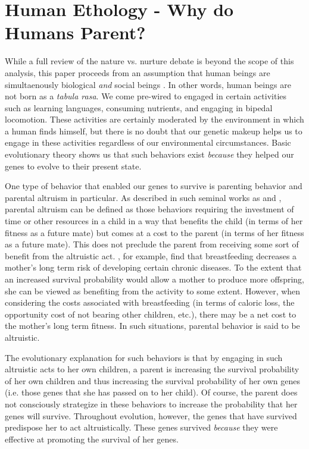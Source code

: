 \documentclass[1p, review]{elsarticle}\usepackage[]{graphicx}\usepackage[]{color}
\begin{document}
\section{Human Ethology - Why do Humans Parent?}

While a full review of the nature vs. nurture debate is beyond the scope of this analysis, this paper proceeds from an assumption that human beings are simultaenously biological \emph{and} social beings \citep[see for example][]{Plomin1994, Ridley2003}. In other words, human beings are not born as a \emph{tabula rasa}. We come pre-wired to engaged in certain activities such as learning languages, consuming nutrients, and engaging in bipedal locomotion. These activities are certainly moderated by the environment in which a human finds himself, but there is no doubt that our genetic makeup helps us to engage in these activities regardless of our environmental circumstances. Basic evolutionary theory shows us that such behaviors exist \emph{because} they helped our genes to evolve to their present state. 

One type of behavior that enabled our genes to survive is parenting behavior and parental altruism in particular. As described in such seminal works as \citet{Hamilton1964} and \citet{Trivers1974}, parental altruism can be defined as those behaviors requiring the investment of time or other resources in a child in a way that benefits the child (in terms of her fitness as a future mate) but comes at a cost to the parent (in terms of her fitness as a future mate). This does not preclude the parent from receiving some sort of benefit from the altruistic act. \citet{Stuebe2010}, for example, find that breastfeeding decreases a mother's long term risk of developing certain chronic diseases. To the extent that an increased survival probability would allow a mother to produce more offspring, she can be viewed as benefiting from the activity to some extent. However, when considering the costs associated with breastfeeding (in terms of caloric loss, the opportunity cost of not bearing other children, etc.), there may be a net cost to the mother's long term fitness. In such situations, parental behavior is said to be altruistic. 

The evolutionary explanation for such behaviors is that by engaging in such altruistic acts to her own children, a parent is increasing the survival probability of her own children and thus increasing the survival probability of her own genes (i.e. those genes that she has passed on to her child). Of course, the parent does not consciously strategize in these behaviors to increase the probability that her genes will survive. Throughout evolution, however, the genes that have survived predispose her to act altruistically. These genes survived \emph{because} they were effective at promoting the survival of her genes. 
\end{document}
